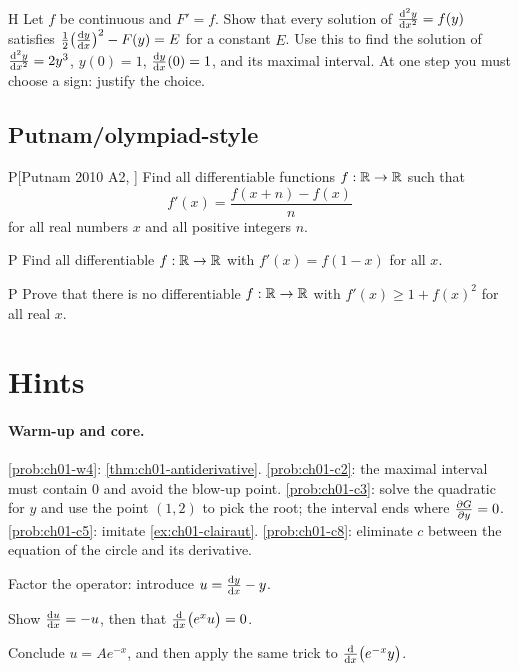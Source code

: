 \begin{problem}{H}\label{prob:ch01-h5}
Let $f$ be continuous and $F' = f$. Show that every solution of
$\frac{\mathrm{d}^{2}y}{\mathrm{d}x^{2}} = f(y)$ satisfies $\tfrac12\bigl(\frac{\mathrm{d}y}{\mathrm{d}x}\bigr)^2 - F(y) = E$
for a constant $E$. Use this to find the solution of
$\frac{\mathrm{d}^{2}y}{\mathrm{d}x^{2}} = 2y^3$, $y(0) = 1$, $\frac{\mathrm{d}y}{\mathrm{d}x}(0) = 1$, and its maximal
interval. At one step you must choose a sign: justify the choice.
\end{problem}

\subsection*{Putnam/olympiad-style}

\begin{problem}{P}[Putnam 2010 A2, \cite{Putnam2010}]\label{prob:ch01-p1}
Find all differentiable functions $f:\mathbb{R}\to\mathbb{R}$ such that
\[
  f'(x) = \frac{f(x+n) - f(x)}{n}
\]
for all real numbers $x$ and all positive integers $n$.
\end{problem}

\begin{problem}{P}\label{prob:ch01-p2}
Find all differentiable $f:\mathbb{R}\to\mathbb{R}$ with $f'(x) = f(1 - x)$ for all $x$.
\end{problem}

\begin{problem}{P}\label{prob:ch01-p3}
Prove that there is no differentiable $f:\mathbb{R}\to\mathbb{R}$ with
$f'(x)\ge 1 + f(x)^2$ for all real $x$.
\end{problem}

\section{Hints}\label{sec:ch01-hints}

\paragraph{Warm-up and core.}
\cref{prob:ch01-w4}: \cref{thm:ch01-antiderivative}.
\cref{prob:ch01-c2}: the maximal interval must contain $0$ and avoid the blow-up
point.
\cref{prob:ch01-c3}: solve the quadratic for $y$ and use the point $(1,2)$ to
pick the root; the interval ends where $\frac{\partial G}{\partial y} = 0$.
\cref{prob:ch01-c5}: imitate \cref{ex:ch01-clairaut}.
\cref{prob:ch01-c8}: eliminate $c$ between the equation of the circle and its
derivative.

\begin{hintlevels}
  \item Factor the operator: introduce $u = \frac{\mathrm{d}y}{\mathrm{d}x} - y$.
  \item Show $\frac{\mathrm{d}u}{\mathrm{d}x} = -u$, then that $\frac{\mathrm{d}}{\mathrm{d}x}\bigl(e^{x}u\bigr) = 0$.
  \item Conclude $u = Ae^{-x}$, and then apply the same trick to
        $\frac{\mathrm{d}}{\mathrm{d}x}\bigl(e^{-x}y\bigr)$.
\end{hintlevels}

